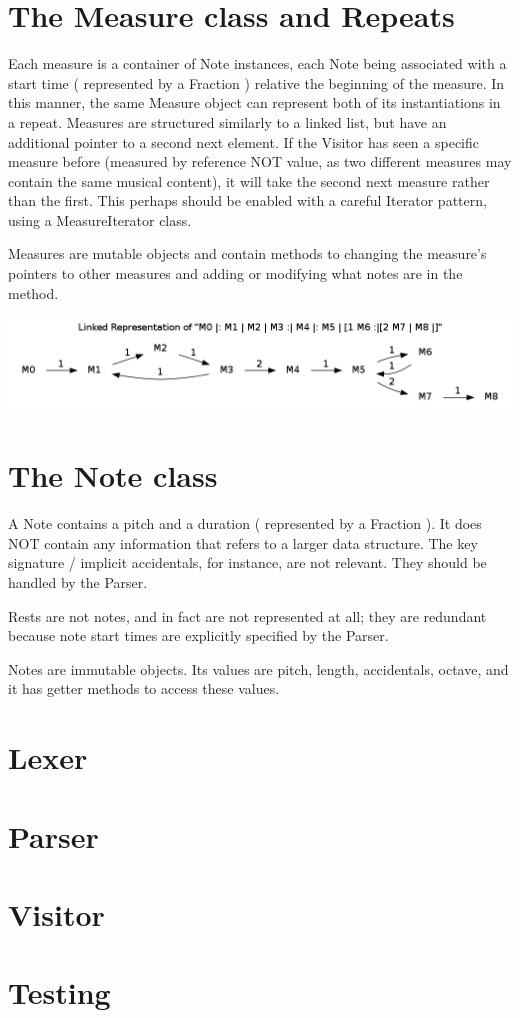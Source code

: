 \documentclass{amsart}
\begin{document}
\section{ The Measure class and Repeats }

Each measure is a container of Note instances, each Note being associated with a start time ( represented by a Fraction ) relative the beginning of the measure. In this manner, the same Measure object can represent both of its instantiations in a repeat. Measures are structured similarly to a linked list, but have an additional pointer to a second next element. If the Visitor has seen a specific measure before (measured by reference NOT value, as two different measures may contain the same musical content), it will take the second next measure rather than the first. This perhaps should be enabled with a careful Iterator pattern, using a MeasureIterator class.  

Measures are mutable objects and contain methods to changing the measure's pointers to other measures and adding or modifying what notes are in the method.  

\includegraphics[width=\linewidth]{measure_example.png}

\section{ The Note class }
A Note contains a pitch and a duration  ( represented by a Fraction ).  It does NOT contain any information that refers to a larger data structure. The key signature / implicit accidentals, for instance, are not relevant. They should be handled by the Parser.

Rests are not notes, and in fact are not represented at all; they are redundant because note start times are explicitly specified by the Parser.

Notes are immutable objects.  Its values are pitch, length, accidentals, octave, and it has getter methods to access these values.  

\section{ Lexer }

\section{ Parser }

\section{ Visitor }

\section{ Testing }
\end{document}
